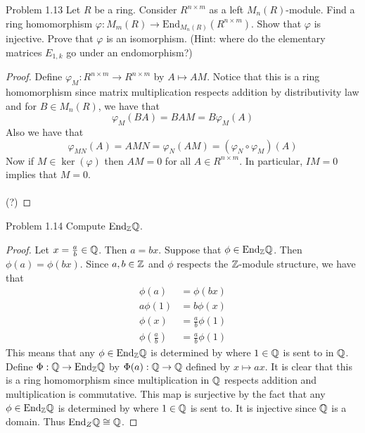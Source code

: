 \documentclass[a4paper]{article}
\begin{document}
\begin{ex}{Problem 1.13}{} Let $R$ be a ring. Consider $R^{n\times m}$ as a left $M_n(R)$-module. Find a ring homomorphism $\varphi:M_m(R)\to\text{End}_{M_n(R)}(R^{n\times m})$. Show that $\varphi$ is injective. Prove that $\varphi$ is an isomorphism. (Hint: where do the elementary matrices $E_{1,k}$ go under an endomorphism?) \tcbline
\begin{proof}
Define $\varphi_M:R^{n\times m}\to R^{n\times m}$ by $A\mapsto AM$. Notice that this is a ring homomorphism since matrix multiplication respects addition by distributivity law and for $B\in M_n(R)$, we have that $$\varphi_M(BA)=BAM=B\varphi_M(A)$$ Also we have that $$\varphi_{MN}(A)=AMN=\varphi_N(AM)=(\varphi_N\circ\varphi_M)(A)$$ Now if $M\in\ker(\varphi)$ then $AM=0$ for all $A\in R^{n\times m}$. In particular, $IM=0$ implies that $M=0$. \\~\\

(?)
\end{proof}
\end{ex}

\begin{ex}{Problem 1.14}{} Compute $\text{End}_{\mathbb{Z}}\mathbb{Q}$. \tcbline
\begin{proof}
Let $x=\frac{a}{b}\in\mathbb{Q}$. Then $a=bx$. Suppose that $\phi\in\text{End}_{\mathbb{Z}}\mathbb{Q}$. Then $\phi(a)=\phi(bx)$. Since $a,b\in\mathbb{Z}$ and $\phi$ respects the $\mathbb{Z}$-module structure, we have that 
\begin{align*}
\phi(a)&=\phi(bx)\\
a\phi(1)&=b\phi(x)\\
\phi(x)&=\frac{a}{b}\phi(1)\\
\phi\left(\frac{a}{b}\right)&=\frac{a}{b}\phi(1)
\end{align*}
This means that any $\phi\in\text{End}_{\mathbb{Z}}\mathbb{Q}$ is determined by where $1\in\mathbb{Q}$ is sent to in $\mathbb{Q}$. Define $\Phi:\mathbb{Q}\to\text{End}_{\mathbb{Z}}\mathbb{Q}$ by $\Phi(a):\mathbb{Q}\to\mathbb{Q}$ defined by $x\mapsto ax$. It is clear that this is a ring homomorphism since multiplication in $\mathbb{Q}$ respects addition and multiplication is commutative. This map is surjective by the fact that any $\phi\in\text{End}_{\mathbb{Z}}\mathbb{Q}$ is determined by where $1\in\mathbb{Q}$ is sent to. It is injective since $\mathbb{Q}$ is a domain. Thus $\text{End}_Z\mathbb{Q}\cong\mathbb{Q}$. 
\end{proof}
\end{ex}
\end{document}

